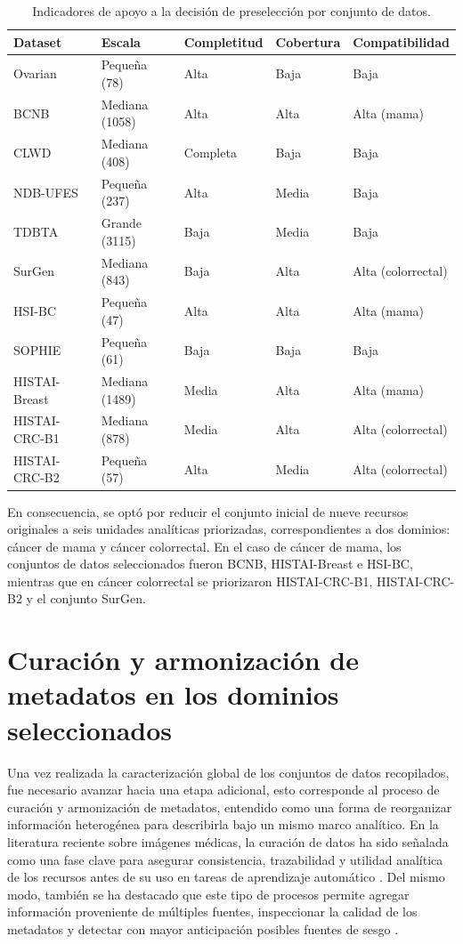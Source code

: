 \begin{table}[htbp]
\centering
\caption{Indicadores de apoyo a la decisión de preselección por conjunto de datos.}
\label{tab:indicadores_preseleccion}
\small
\begin{tabular}{lllll}
\toprule
Dataset & Escala & Completitud & Cobertura & Compatibilidad \\
\midrule
Ovarian       & Pequeña (78) & Alta  & Baja   & Baja \\
BCNB          & Mediana (1058) & Alta & Alta  & Alta (mama) \\
CLWD          & Mediana (408) & Completa & Baja & Baja \\
NDB-UFES      & Pequeña (237) & Alta & Media & Baja \\
TDBTA         & Grande (3115) & Baja & Media & Baja \\
SurGen        & Mediana (843) & Baja & Alta  & Alta (colorrectal) \\

HSI-BC      & Pequeña (47)  & Alta & Alta  & Alta (mama) \\
SOPHIE        & Pequeña (61)  & Baja & Baja  & Baja \\
HISTAI-Breast & Mediana (1489) & Media & Alta & Alta (mama) \\
HISTAI-CRC-B1 & Mediana (878) & Media & Alta & Alta (colorrectal) \\
HISTAI-CRC-B2 & Pequeña (57) & Alta & Media & Alta (colorrectal) \\
\bottomrule
\end{tabular}
\end{table}

En consecuencia, se optó por reducir el conjunto inicial de nueve recursos originales a seis unidades analíticas priorizadas, correspondientes a dos dominios: cáncer de mama y cáncer colorrectal. En el caso de cáncer de mama, los conjuntos de datos seleccionados fueron BCNB, HISTAI-Breast e HSI-BC, mientras que en cáncer colorrectal se priorizaron HISTAI-CRC-B1, HISTAI-CRC-B2 y el conjunto SurGen.

\section{Curación y armonización de metadatos en los dominios seleccionados}
\label{sec:caracterizacion_datasets}

Una vez realizada la caracterización global de los conjuntos de datos recopilados, fue necesario avanzar hacia una etapa adicional, esto corresponde al proceso de curación y armonización de metadatos, entendido como una forma de reorganizar información heterogénea para describirla bajo un mismo marco analítico. En la literatura reciente sobre imágenes médicas, la curación de datos ha sido señalada como una fase clave para asegurar consistencia, trazabilidad y utilidad analítica de los recursos antes de su uso en tareas de aprendizaje automático \parencite{Galbusera2024ImageCurationRadiology}. Del mismo modo, también se ha destacado que este tipo de procesos permite agregar información proveniente de múltiples fuentes, inspeccionar la calidad de los metadatos y detectar con mayor anticipación posibles fuentes de sesgo \parencite{Denner2023MedicalImageDatasetPreparation}.

